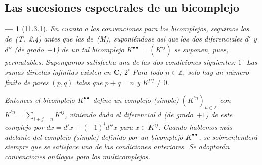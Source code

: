 \documentclass[10pt,oneside,openany]{book}
\theoremstyle{egaenv}\newtheorem*{env}{---}
\theoremstyle{egastatement}
\theoremstyle{egadescription}
\begin{document}
\subsection{Las sucesiones espectrales de un bicomplejo}
\label{subsection:0.11.3}
\label{subsection:0.11.3-fr}

\begin{env}[11.3.1]
\label{0.11.3.1}
\label{0.11.3.1-fr}
En cuanto a las convenciones para los bicomplejos, seguimos las de~(T,~2.4) antes que las de~(M), suponiéndose así que los dos diferenciales $d'$ y $d''$ (de grado~$+1$) de un tal bicomplejo $K^{\bullet\bullet}=(K^{ij})$ se suponen, pues, \emph{permutables}. Supongamos satisfecha \emph{una} de las dos condiciones siguientes: $1^\circ$ Las \emph{sumas directas infinitas} existen en $\boldsymbol{C}$; $2^\circ$ Para todo $n\in\mathbb Z$, solo hay un número \emph{finito} de pares $(p,q)$ tales que $p+q=n$ y $K^{pq}\ne0$.
 
Entonces el bicomplejo $K^{\bullet\bullet}$ define un \emph{complejo} (simple) $(K^{\prime n})_{n\in\mathbb Z}$ con $K^{\prime n}=\sum_{i+j=n}K^{ij}$, viniendo dado el diferencial $d$ (de grado~$+1$) de este complejo por $dx=d'x+(-1)^i d''x$ para $x\in K^{ij}$.
Cuando hablemos más adelante del \emph{complejo (simple) definido por un bicomplejo $K^{\bullet\bullet}$}, se sobreentenderá siempre que se satisface una de las condiciones anteriores.
Se adoptarán convenciones análogas para los multicomplejos.


\end{env}
\end{document}

